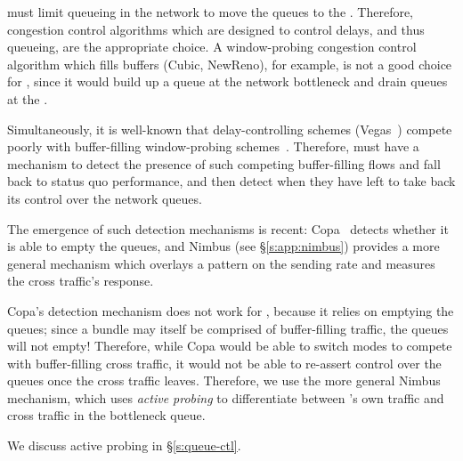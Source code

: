  \name must limit queueing in the network to move the queues to the \inbox. Therefore, congestion control algorithms which are designed to control delays, and thus queueing, are the appropriate choice. 
A window-probing congestion control algorithm which fills buffers (\eg Cubic, NewReno), for example, is not a good choice for \name, since it would build up a queue at the network bottleneck and drain queues at the \inbox.

 Simultaneously, it is well-known that delay-controlling schemes (\eg Vegas~\cite{vegas}) compete poorly with buffer-filling window-probing schemes~\cite{copa}.
Therefore, \name must have a mechanism to detect the presence of such competing buffer-filling flows and fall back to status quo performance, and then detect when they have left to take back its control over the network queues. 

The emergence of such detection mechanisms is recent: Copa~\cite{copa} detects whether it is able to empty the queues, and Nimbus (see \S\ref{s:app:nimbus}) provides a more general mechanism which overlays a pattern on the sending rate and measures the cross traffic's response.

Copa's detection mechanism does not work for \name, because it relies on emptying the queues; since a bundle may itself be comprised of buffer-filling traffic, the queues will not empty! Therefore, while Copa would be able to switch modes to compete with buffer-filling cross traffic, it would not be able to re-assert control over the queues once the cross traffic leaves.
Therefore, we use the more general Nimbus mechanism, which uses \emph{active probing} to differentiate between \name's own traffic and cross traffic in the bottleneck queue.

We discuss active probing in \S\ref{s:queue-ctl}.

